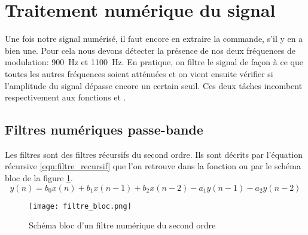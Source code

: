 \section{Traitement numérique du signal}
Une fois notre signal numérisé, il faut encore en extraire la commande, s'il y en a bien une. Pour cela nous devons détecter la présence de nos deux fréquences de modulation: \SI{900}{\hertz} et \SI{1100}{\hertz}. En pratique, on filtre le signal de façon à ce que toutes les autres fréquences soient atténuées et on vient ensuite vérifier si l'amplitude du signal dépasse encore un certain seuil. Ces deux tâches incombent respectivement aux fonctions  et .

\subsection{Filtres numériques passe-bande}
Les filtres sont des filtres récursifs du second ordre. Ils sont décrits par l'équation récursive \ref{eqn:filtre_recursif} que l'on retrouve dans la fonction  ou par le schéma bloc de la figure \ref{fig:filtre_bloc}.
\begin{equation}
y(n) = b_0x(n) + b_1x(n-1) + b_2x(n-2) - a_1y(n-1) - a_2y(n-2)
\label{eqn:filtre_recursif}
\end{equation}
\begin{figure}[htbp]
\centering
\texttt{[image: filtre\_bloc.png]}
\caption{Schéma bloc d'un filtre numérique du second ordre}
\label{fig:filtre_bloc}
\end{figure}

